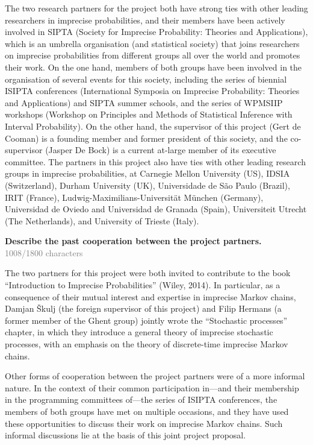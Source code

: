 \documentclass[11pt,dvipsnames,usenames,a4paper]{article}
\begin{document}
The two research partners for the project both have strong ties with other leading researchers in imprecise probabilities, and their members have been actively involved in SIPTA (Society for Imprecise Probability: Theories and Applications), which is an umbrella organisation (and statistical society) that joins researchers on imprecise probabilities from different groups all over the world and promotes their work. 
On the one hand, members of both groups have been involved in the organisation of several events for this society, including the series of biennial ISIPTA conferences (International Symposia on Imprecise Probability: Theories and Applications) and SIPTA summer schools, and the series of WPMSIIP workshops (Workshop on Principles and Methods of Statistical Inference with Interval Probability). 
On the other hand, the supervisor of this project (Gert de Cooman) is a founding member and former president of this society, and the co-supervisor (Jasper De Bock) is a current at-large member of its executive committee. 
The partners in this project also have ties with other leading research groups in imprecise probabilities, at Carnegie Mellon University (US), IDSIA (Switzerland), Durham University (UK), Universidade de S\~ao Paulo (Brazil), IRIT (France), Ludwig-Maximilians-Universit\"at M\"unchen (Germany), Universidad de Oviedo and Universidad de Granada (Spain), Universiteit Utrecht (The Netherlands), and University of Trieste (Italy). 

\textbf{Describe the past cooperation between the project partners.}\\
\textcolor{Gray}{1008/1800 characters}

The two partners for this project were both invited to contribute to the book ``Introduction to Imprecise Probabilities'' (Wiley, 2014). 
In particular, as a consequence of their mutual interest and expertise in imprecise Markov chains, Damjan \v{S}kulj (the foreign supervisor of this project) and Filip Hermans (a former member of the Ghent group) jointly wrote the ``Stochastic processes'' chapter, in which they introduce a general theory of imprecise stochastic processes, with an emphasis on the theory of discrete-time imprecise Markov chains.

Other forms of cooperation between the project partners were of a more informal nature. 
In the context of their common participation in---and their membership in the programming committees of---the series of ISIPTA conferences, the members of both groups have met on multiple occasions, and they have used these opportunities to discuss their work on imprecise Markov chains. 
Such informal discussions lie at the basis of this joint project proposal.
\end{document}

